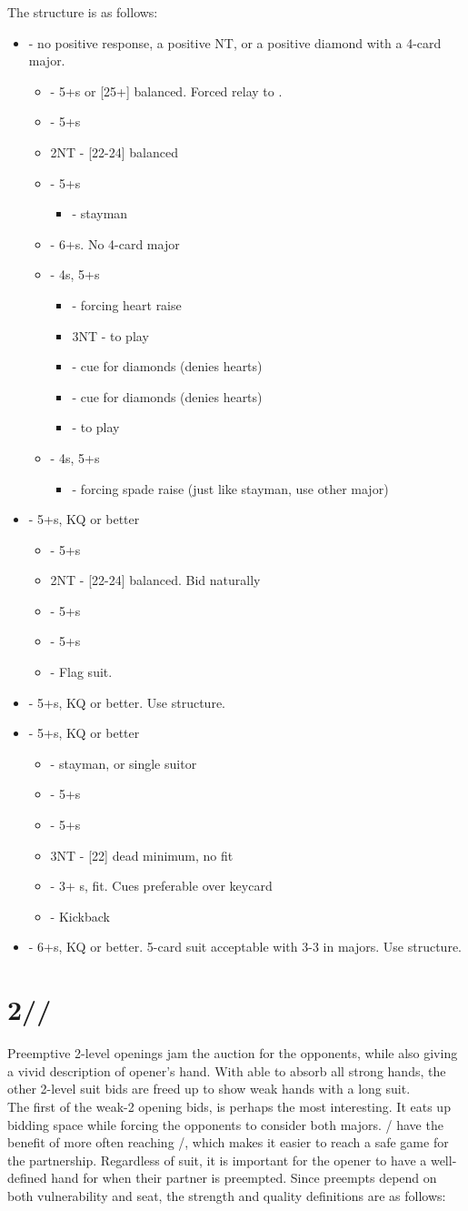 \documentclass[12pt]{report}
\newcommand{\n}{\\}
\newcommand{\q}[1]{\multido{}{#1}{\qquad}}
\newcommand{\ul}[1]{\begin{itemize}#1\end{itemize}}
\newcommand{\li}[1]{\item[~] \q{#1}}
\newcommand{\bidsection}[2]{\section{\texorpdfstring{#1}{#2}}}
\begin{document}
    The structure is as follows:

    \ul {
        \li0  - no positive response, a positive NT, or a positive diamond with a 4-card major.
        \ul {
            \li0 \he2 - 5+\he{}s or [25+] balanced.  Forced relay to \sp2.
            \li0 \sp2 - 5+\sp{}s
            \li0 2NT - [22-24] balanced
            \li0 \cl3 - 5+\cl{}s
            \ul {
                \li0 \di3 - stayman
            }
            \li0 \di3 - 6+\di{}s.  No 4-card major
            \li0 \he3 - 4\he{}s, 5+\di{}s
            \ul {
                \li0 \sp3 - forcing heart raise
                \li0 3NT - to play
                \li0 \cl4 - cue for diamonds (denies hearts)
                \li0 \di4 - cue for diamonds (denies hearts)
                \li0 \he4 - to play
            }
            \li0 \sp3 - 4\sp{}s, 5+\di{}s
            \ul {
                \li0 \he4 - forcing spade raise (just like stayman, use other major)
            }
        }
        \li0 \he2 - 5+\he{}s, KQ or better
        \ul {
            \li0 \sp2 - 5+\sp{}s
            \li0 2NT - [22-24] balanced.  Bid naturally
            \li0 \cl3 - 5+\cl{}s
            \li0 \di3 - 5+\di{}s
            \li0 \he3 - Flag suit.
        }

        \li0 \sp2 - 5+\sp{}s, KQ or better.  Use \he2 structure.
        \li0 \cl3 - 5+\cl{}s, KQ or better
        \ul {
            \li0 \di3 - stayman, or \di{} single suitor
            \li0 \he3 - 5+\he{}s
            \li0 \sp3 - 5+\sp{}s
            \li0 3NT - [22] dead minimum, no fit
            \li0 \cl4 - 3+ \cl{}s, fit.  Cues preferable over keycard
            \li0 \di4 - Kickback
        }
        \li0 \di3 - 6+\di{}s, KQ or better.  5-card suit acceptable with 3-3 in majors.  Use \cl3 structure.
    }

\bidsection{2\di{}/\he{}/\sp{}}{2♢/♡/♠} \label{2:9}

    Preemptive 2-level openings jam the auction for the opponents, while also giving a vivid description of opener's hand.  With  able to absorb all strong hands, the other 2-level suit bids are freed up to show weak hands with a long suit. \n

    The first of the weak-2 opening bids,  is perhaps the most interesting.  It eats up bidding space while forcing the opponents to consider both majors.  / have the benefit of more often reaching /, which makes it easier to reach a safe game for the partnership.  Regardless of suit, it is important for the opener to have a well-defined hand for when their partner is preempted.  Since preempts depend on both vulnerability and seat, the strength and quality definitions are as follows:
\end{document}
